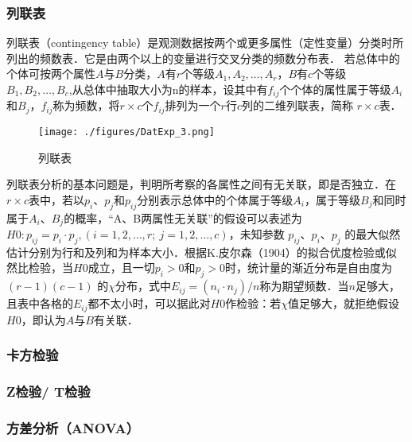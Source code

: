 \subsubsection{列联表}
列联表（contingency table）是观测数据按两个或更多属性（定性变量）分类时所列出的频数表．它是由两个以上的变量进行交叉分类的频数分布表．
若总体中的个体可按两个属性$A$与$B$分类，$A$有$r$个等级$A_1,A_2,\dots,A_r$，$B$有$c$个等级$B_1,B_2,\dots, B_c$,从总体中抽取大小为n的样本，设其中有$f_{ij}$个个体的属性属于等级$A_i$和$B_j$，$f_{ij}$称为频数，将$r\times c$个$f_{ij}$排列为一个$r$行$c$列的二维列联表，简称 $r\times c$表．
\begin{figure}[ht]
\centering
\texttt{[image: ./figures/DatExp\_3.png]}
\caption{列联表} \label{DatExp_fig3}
\end{figure}
列联表分析的基本问题是，判明所考察的各属性之间有无关联，即是否独立．在$r\times c$表中，若以$p_i$、$p_j$和$p_{ij}$分别表示总体中的个体属于等级$A_i$，属于等级$B_j$和同时属于$A_i$、$B_j$的概率，“A、B两属性无关联”的假设可以表述为$H0: p_{ij}=p_i\cdot p_j, (i=1,2,\dots, r; \ j=1,2,\dots,c)$，未知参数 $p_{ij}$、$p_i$、$p_j$ 的最大似然估计分别为行和及列和为样本大小．根据K.皮尔森（1904）的拟合优度检验或似然比检验，当$H0$成立，且一切$p_i>0$和$p_j>0$时，统计量的渐近分布是自由度为$(r-1)(c-1)$ 的$\chi$分布，式中$E_{ij}=(n_i \cdot n_j)/n$称为期望频数．当$n$足够大，且表中各格的$E_{ij}$都不太小时，可以据此对$H0$作检验：若$\chi$值足够大，就拒绝假设$H0$，即认为$A$与$B$有关联．
\subsubsection{卡方检验}
\subsubsection{Z检验/ T检验}
\subsubsection{方差分析（ANOVA）}
